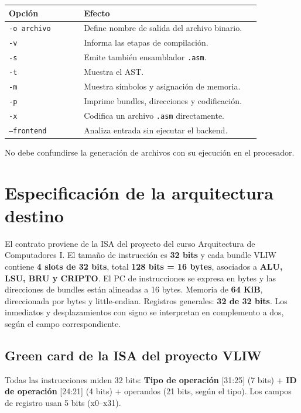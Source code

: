 \begin{longtable}[]{@{}p{0.280\linewidth}p{0.660\linewidth}@{}}
\toprule\noalign{}
Opción & Efecto \\
\midrule\noalign{}
\endhead
\bottomrule\noalign{}
\endlastfoot
\texttt{-o archivo} & Define nombre de salida del
archivo binario. \\
\texttt{-v} & Informa las etapas de compilación. \\
\texttt{-s} & Emite también ensamblador
\texttt{.asm}. \\
\texttt{-t} & Muestra el AST. \\
\texttt{-m} & Muestra símbolos y asignación de
memoria. \\
\texttt{-p} & Imprime bundles, direcciones y
codificación. \\
\texttt{-x} & Codifica un archivo
\texttt{.asm} directamente. \\
\texttt{--frontend} & Analiza entrada sin ejecutar el
backend. \\
\end{longtable}

No debe confundirse la generación de archivos con su ejecución en el
procesador.

\section{Especificación de la arquitectura destino}\label{3-especificaciuxf3n-de-la-arquitectura-destino--apartado-81}

El contrato proviene de la ISA del proyecto del curso Arquitectura de
Computadores I. El tamaño de instrucción es \textbf{32 bits} y cada
bundle VLIW contiene \textbf{4 slots de 32 bits}, total \textbf{128 bits
= 16 bytes}, asociados a \textbf{ALU, LSU, BRU y CRIPTO}. El PC de
instrucciones se expresa en bytes y las direcciones de bundles están
alineadas a 16 bytes. Memoria de \textbf{64 KiB}, direccionada por bytes
y little-endian. Registros generales: \textbf{32 de 32 bits}. Los
inmediatos y desplazamientos con signo se interpretan en complemento a
dos, según el campo correspondiente.

\subsection{Green card de la ISA del proyecto
VLIW}\label{green-card-de-la-isa-del-proyecto-vliw}

Todas las instrucciones miden 32 bits: \textbf{Tipo de operación}
{[}31:25{]} (7 bits) + \textbf{ID de operación} {[}24:21{]} (4 bits) +
operandos (21 bits, según el tipo). Los campos de registro usan 5 bits
(x0--x31).
\newpage
